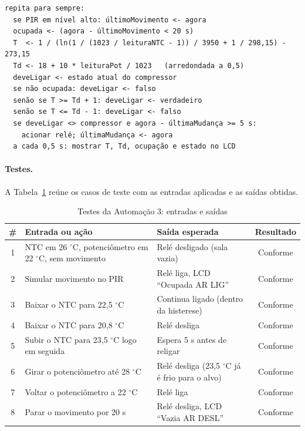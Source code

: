 \documentclass[12pt]{article}
\newcommand{\conf}{Conforme}
\begin{document}
\begin{lstlisting}[style=pseudo]
repita para sempre:
  se PIR em nível alto: últimoMovimento <- agora
  ocupada <- (agora - últimoMovimento < 20 s)
  T  <- 1 / (ln(1 / (1023 / leituraNTC - 1)) / 3950 + 1 / 298,15) - 273,15
  Td <- 18 + 10 * leituraPot / 1023   (arredondada a 0,5)
  deveLigar <- estado atual do compressor
  se não ocupada: deveLigar <- falso
  senão se T >= Td + 1: deveLigar <- verdadeiro
  senão se T <= Td - 1: deveLigar <- falso
  se deveLigar <> compressor e agora - últimaMudança >= 5 s:
    acionar relé; últimaMudança <- agora
  a cada 0,5 s: mostrar T, Td, ocupação e estado no LCD
\end{lstlisting}

\paragraph{Testes.} A Tabela~\ref{tab:teste3} reúne os casos de teste com as entradas aplicadas e as saídas obtidas.

\begin{table}[!htb]
\centering
\caption{Testes da Automação 3: entradas e saídas}\label{tab:teste3}
\small
\begin{tabularx}{\textwidth}{cXXc}
\toprule
\# & Entrada ou ação & Saída esperada & Resultado \\
\midrule
1 & NTC em 26 $^\circ$C, potenciômetro em 22 $^\circ$C, sem movimento & Relé desligado (sala vazia) & \conf \\
2 & Simular movimento no PIR & Relé liga, LCD ``Ocupada AR LIG'' & \conf \\
3 & Baixar o NTC para 22,5 $^\circ$C & Continua ligado (dentro da histerese) & \conf \\
4 & Baixar o NTC para 20,8 $^\circ$C & Relé desliga & \conf \\
5 & Subir o NTC para 23,5 $^\circ$C logo em seguida & Espera 5 s antes de religar & \conf \\
6 & Girar o potenciômetro até 28 $^\circ$C & Relé desliga (23,5 $^\circ$C já é frio para o alvo) & \conf \\
7 & Voltar o potenciômetro a 22 $^\circ$C & Relé liga & \conf \\
8 & Parar o movimento por 20 s & Relé desliga, LCD ``Vazia AR DESL'' & \conf \\
\bottomrule
\end{tabularx}
\end{table}
\end{document}
